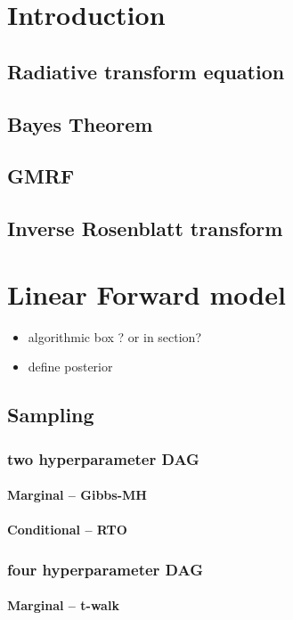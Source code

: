 \chapter{Introduction}
\section{Radiative transform equation}
\section{Bayes Theorem}
\section{GMRF}
\section{Inverse Rosenblatt transform}

\chapter{Linear Forward model}
\begin{itemize}
	\item algorithmic box ?  or in section?
	\item define posterior
\end{itemize}

\section{Sampling}

\subsection{two hyperparameter DAG}
\subsubsection{Marginal -- Gibbs-MH}
\subsubsection{Conditional -- RTO}


\subsection{four hyperparameter DAG}
\subsubsection{Marginal -- t-walk}
